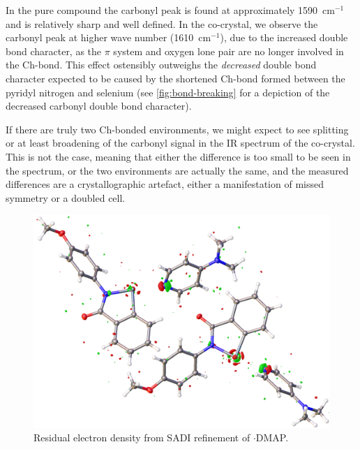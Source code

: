 \begin{refsection}
In the pure compound the carbonyl peak is found at approximately 1590~cm$^{-1}$ and is relatively sharp and well defined.
In the co-crystal, we observe the carbonyl peak at higher wave number (1610~cm$^{-1}$), due to the increased double bond character, as the $\pi$ system and oxygen lone pair are no longer involved in the Ch-bond.
This effect ostensibly outweighs the \emph{decreased} double bond character expected to be caused by the shortened Ch-bond formed between the pyridyl nitrogen and selenium (see \cref{fig:bond-breaking} for a depiction of the decreased carbonyl double bond character).

If there are truly two Ch-bonded environments, we might expect to see splitting or at least broadening of the carbonyl signal in the IR spectrum of the co-crystal.
This is not the case, meaning that either the difference is too small to be seen in the spectrum, or the two environments are actually the same, and the measured differences are a crystallographic artefact, either a manifestation of missed symmetry or a doubled cell.

\begin{figure}
  \centering
  \includegraphics[width=0.7\linewidth]{Figures/residual-dens.png}
  \caption{Residual electron density from SADI refinement of \texorpdfstring{$ \cdot $}{.}DMAP.}\label{fig:residual-dens}
\end{figure}


\end{refsection}
